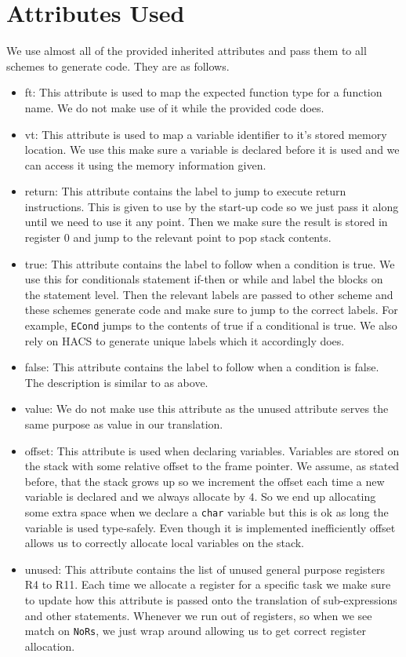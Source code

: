 \documentclass{article}
\begin{document}
\section{Attributes Used}
We use almost all of the provided inherited attributes and pass them to all schemes to generate code. They are as follows.
\begin{itemize}
    \item ft: This attribute is used to map the expected function type for a function name. We do not make use of it while the provided code does. 
    \item vt: This attribute is used to map a variable identifier to it's stored memory location. We use this make sure a variable is declared before it is used and we can access it using the memory information given. 
    \item return: This attribute contains the label to jump to execute return instructions. This is given to use by the start-up code so we just pass it along until we need to use it any point. Then we make sure the result is stored in register $0$ and jump to the relevant point to pop stack contents.
    \item true: This attribute contains the label to follow when a condition is true. We use this for conditionals statement if-then or while and label the blocks on the statement level. Then the relevant labels are passed to other scheme and these schemes generate code and make sure to jump to the correct labels. For example, \texttt{ECond} jumps to the contents of true if a conditional is true. We also rely on HACS to generate unique labels which it accordingly does.
    \item false: This attribute contains the label to follow when a condition is false. The description is similar to as above.
    \item value: We do not make use this attribute as the unused attribute serves the same purpose as value in our translation.
    \item offset: This attribute is used when declaring variables. Variables are stored on the stack with some relative offset to the frame pointer. We assume, as stated before, that the stack grows up so we increment the offset each time a new variable is declared and we always allocate by $4$. So we end up allocating some extra space when we declare a \texttt{char} variable but this is ok as long the variable is used type-safely. Even though it is implemented inefficiently offset allows us to correctly allocate local variables on the stack. 
    \item unused: This attribute contains the list of unused  general purpose registers R4 to R11. Each time we allocate a register for a specific task we make sure to update how this attribute is passed onto the translation of sub-expressions and other statements. Whenever we run out of registers, so when we see match on \texttt{NoRs}, we just wrap around allowing us to get correct register allocation.

\end{itemize}
\end{document}
